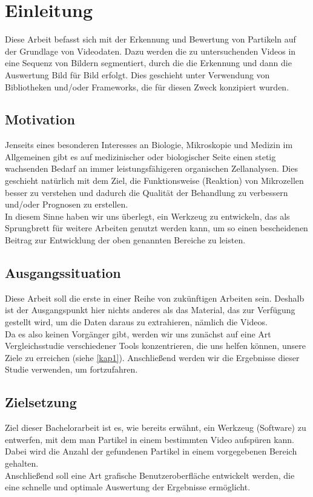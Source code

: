 \chapter{Einleitung}
Diese Arbeit befasst sich mit der Erkennung und Bewertung von Partikeln auf der Grundlage von Videodaten. Dazu werden die zu untersuchenden Videos in eine Sequenz von Bildern segmentiert, durch die die Erkennung und dann die Auswertung Bild für Bild erfolgt. Dies geschieht unter Verwendung von Bibliotheken und/oder Frameworks, die für diesen Zweck konzipiert wurden.

\section{Motivation}
Jenseits eines besonderen Interesses an Biologie, Mikroskopie und Medizin im Allgemeinen gibt es auf medizinischer oder biologischer Seite einen stetig wachsenden Bedarf an immer leistungsfähigeren organischen Zellanalysen. Dies geschieht natürlich mit dem Ziel, die Funktionsweise (Reaktion) von Mikrozellen besser zu verstehen und dadurch die Qualität der Behandlung zu verbessern und/oder Prognosen zu erstellen.\\
In diesem Sinne haben wir uns überlegt, ein Werkzeug zu entwickeln, das als Sprungbrett für weitere Arbeiten genutzt werden kann, um so einen bescheidenen Beitrag zur Entwicklung der oben genannten Bereiche zu leisten.

\section{Ausgangssituation}
Diese Arbeit soll die erste in einer Reihe von zukünftigen Arbeiten sein. Deshalb ist der Ausgangspunkt hier nichts anderes als das Material, das zur Verfügung gestellt wird, um die Daten daraus zu extrahieren, nämlich die Videos.\\
Da es also keinen Vorgänger gibt, werden wir uns zunächst auf eine Art Vergleichsstudie verschiedener Tools konzentrieren, die uns helfen können, unsere Ziele zu erreichen (siehe \ref{kap1}). Anschließend werden wir die Ergebnisse dieser Studie verwenden, um fortzufahren.

\section{Zielsetzung}
Ziel dieser Bachelorarbeit ist es, wie bereits erwähnt, ein Werkzeug (Software) zu entwerfen, mit dem man Partikel in einem bestimmten Video aufspüren kann. Dabei wird die Anzahl der gefundenen Partikel in einem vorgegebenen Bereich gehalten.\\
Anschließend soll eine Art grafische Benutzeroberfläche entwickelt werden, die eine schnelle und optimale Auswertung der Ergebnisse ermöglicht.

